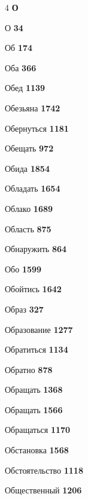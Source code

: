 \begin{multicols}{4}
\vspace{0.6em}\noindent\textbf{\normalsize\sffamily\color{primary} О}\par\vspace{0.2em}
\noindent О \dotfill \textbf{\color{secondary} 34}\par
\noindent Об \dotfill \textbf{\color{secondary} 174}\par
\noindent Оба \dotfill \textbf{\color{secondary} 366}\par
\noindent Обед \dotfill \textbf{\color{secondary} 1139}\par
\noindent Обезьяна \dotfill \textbf{\color{secondary} 1742}\par
\noindent Обернуться \dotfill \textbf{\color{secondary} 1181}\par
\noindent Обещать \dotfill \textbf{\color{secondary} 972}\par
\noindent Обида \dotfill \textbf{\color{secondary} 1854}\par
\noindent Обладать \dotfill \textbf{\color{secondary} 1654}\par
\noindent Облако \dotfill \textbf{\color{secondary} 1689}\par
\noindent Область \dotfill \textbf{\color{secondary} 875}\par
\noindent Обнаружить \dotfill \textbf{\color{secondary} 864}\par
\noindent Обо \dotfill \textbf{\color{secondary} 1599}\par
\noindent Обойтись \dotfill \textbf{\color{secondary} 1642}\par
\noindent Образ \dotfill \textbf{\color{secondary} 327}\par
\noindent Образование \dotfill \textbf{\color{secondary} 1277}\par
\noindent Обратиться \dotfill \textbf{\color{secondary} 1134}\par
\noindent Обратно \dotfill \textbf{\color{secondary} 878}\par
\noindent Обращать \dotfill \textbf{\color{secondary} 1368}\par
\noindent Обращать \dotfill \textbf{\color{secondary} 1566}\par
\noindent Обращаться \dotfill \textbf{\color{secondary} 1170}\par
\noindent Обстановка \dotfill \textbf{\color{secondary} 1568}\par
\noindent Обстоятельство \dotfill \textbf{\color{secondary} 1118}\par
\noindent Общественный \dotfill \textbf{\color{secondary} 1206}\par

\end{multicols}
